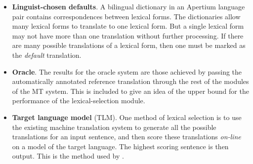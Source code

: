 \documentclass[11pt]{article}
\newcommand{\comment}[1]{\todo{#1}}
\begin{document}
\begin{itemize}
\addtolength{\itemsep}{-0.05in}
\item \textbf{Linguist-chosen defaults}. 
  A bilingual dictionary in an
  Apertium language pair contains correspondences between lexical
  forms. The dictionaries allow many lexical forms to translate to one
  lexical form. 
  But a single lexical form
  may not have more than one translation without further
  processing. If there are many possible translations of a lexical
  form, then one must be marked as the \emph{default} translation. 

\item \textbf{Oracle}.  The results for the oracle system are those
  achieved by passing the automatically annotated reference
  translation through the rest of the modules of the MT system. This
  is included to give an idea of the upper bound for the performance
  of the lexical-selection module. %

\item \textbf{Target language model} (TLM). One method of lexical
  selection is to use the existing machine translation system to
  generate all the possible translations for an input sentence, and
  then score these translations \emph{on-line} on a model of the
  target language. The highest scoring sentence is then 
  output. This is the method used by %
  \cite{melero07a}.  
\end{itemize}
\end{document}
